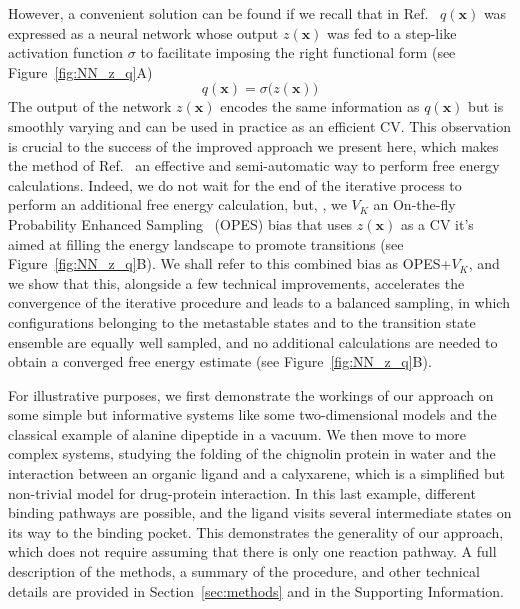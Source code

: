     However, a convenient solution can be found if we recall that in Ref.~  $q(\textbf{x})$ was expressed as a neural network whose output $z(\textbf{x})$ was fed to a step-like activation function $\sigma$ to facilitate imposing the right functional form (see Figure~\ref{fig:NN_z_q}A)
        \begin{equation}
            q(\textbf{x}) =  \sigma \big ( z(\textbf{x}) \big)
        \end{equation}
    The output of the network $z(\textbf{x})$ encodes the same information as $q(\textbf{x})$ but is smoothly varying and can be used in practice as an efficient CV.
    This observation is crucial to the success of the improved approach we present here, which makes the method of Ref.~ an effective and semi-automatic way to perform free energy calculations. 
    Indeed, we do not wait for the end of the iterative process to perform an additional free energy calculation, but, , we  $V_K$  an On-the-fly Probability Enhanced Sampling~\cite{invernizzi2020rethinking, trizio2024advanced} (OPES) bias that uses $z(\textbf{x})$ as a CV  it's aimed at filling the energy landscape to promote transitions (see Figure~\ref{fig:NN_z_q}B).  
    We shall refer to this combined bias as OPES+$V_{K}$, and we show that this, alongside a few technical improvements, accelerates the convergence of the iterative procedure and leads to a balanced sampling, in which configurations belonging to the metastable states and to the transition state ensemble are equally well sampled, and no additional calculations are needed to obtain a converged free energy estimate  (see Figure~\ref{fig:NN_z_q}B).

    For illustrative purposes, we first demonstrate the workings of our approach on some simple but informative systems like some two-dimensional models and the classical example of alanine dipeptide in a vacuum.
    We then move to more complex systems, studying the folding of the chignolin protein in water and the interaction between an organic ligand and a calyxarene, which is a simplified but non-trivial model for drug-protein interaction. 
    In this last example, different binding pathways are possible, and the ligand visits several intermediate states on its way to the binding pocket.
    This demonstrates the generality of our approach, which does not require assuming that there is only one reaction pathway.
    A full description of the methods, a summary of the procedure, and other technical details are provided in Section~\ref{sec:methods} and in the Supporting Information.


